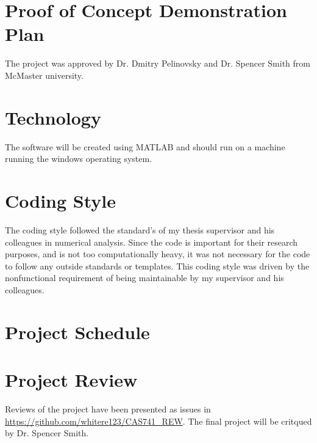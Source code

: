 \documentclass{article}
\begin{document}
\section{Proof of Concept Demonstration Plan} 

The project was approved by Dr. Dmitry Pelinovsky and Dr. Spencer Smith from 
McMaster university.

\section{Technology} 

The software will be created using MATLAB and should run on a machine running 
the windows operating system.

\section{Coding Style} 

The coding style followed the standard's of my thesis supervisor and his 
colleagues in numerical analysis. Since the code is important for their 
research purposes, and is not too computationally heavy, it was not necessary 
for the code to follow any outside standards or templates. This coding style 
was driven by the nonfunctional requirement of being maintainable by my 
supervisor and his colleagues. 

\newpage

\section{Project Schedule}  
\begin{figure}
	\centering 
	
\end{figure}

\newpage
\section{Project Review} 

Reviews of the project have been presented as issues in 
\url{https://github.com/whitere123/CAS741_REW}. The final project will be 
critqued by Dr. Spencer Smith.
\end{document}
